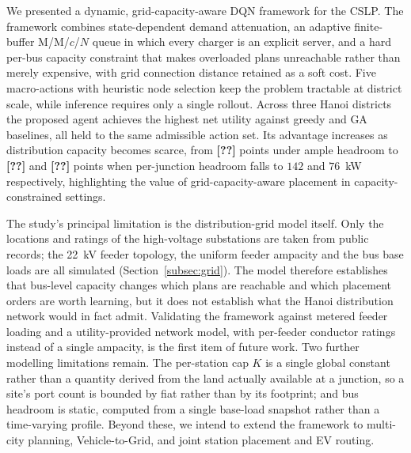\documentclass[graybox]{svmult}
\newcommand{\TODO}[1]{\textbf{[??]}}
\begin{document}
We presented a dynamic, grid-capacity-aware DQN framework for the CSLP. The
framework combines state-dependent demand attenuation, an adaptive finite-buffer
M/M/$c$/$N$ queue in which every charger is an explicit server, and a hard
per-bus capacity constraint that makes overloaded plans unreachable rather than
merely expensive, with grid connection distance retained as a soft cost. Five
macro-actions with heuristic node selection keep the problem tractable at
district scale, while inference requires only a single rollout. Across three
Hanoi districts the proposed agent achieves the highest net utility against
greedy and GA baselines, all held to the same admissible action set. Its
advantage increases as distribution capacity becomes scarce, from \TODO{} points
under ample headroom to \TODO{} and \TODO{} points when per-junction headroom
falls to $142$ and $76$~kW respectively, highlighting the value of
grid-capacity-aware placement in capacity-constrained settings.

The study's principal limitation is the distribution-grid model itself. Only the
locations and ratings of the high-voltage substations are taken from public
records; the 22~kV feeder topology, the uniform feeder ampacity and the bus base
loads are all simulated (Section~\ref{subsec:grid}). The model therefore
establishes that bus-level capacity changes which plans are reachable and which
placement orders are worth learning, but it does not establish what the Hanoi
distribution network would in fact admit. Validating the framework against
metered feeder loading and a utility-provided network model, with per-feeder
conductor ratings instead of a single ampacity, is the first item of future work.
Two further modelling limitations remain. The per-station cap $K$ is a single
global constant rather than a quantity derived from the land actually available
at a junction, so a site's port count is bounded by fiat rather than by its
footprint; and bus headroom is static, computed from a single base-load snapshot
rather than a time-varying profile. Beyond these, we intend to extend the
framework to multi-city planning, Vehicle-to-Grid, and joint station placement
and EV routing.
\end{document}
